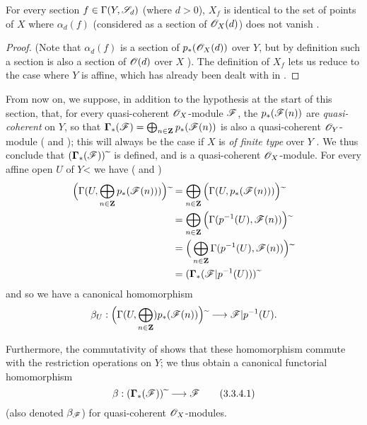 \begin{proposition}[3.3.3]
\label{II.3.3.3}
For every section $f\in\Gamma(Y,\mathscr{S}_d)$ (where $d>0$), $X_f$ is identical to the set of points of $X$ where $\alpha_d(f)$ (considered as a section of $\mathscr{O}_X(d)$) does not vanish .
\end{proposition}

\begin{proof}
(Note that $\alpha_d(f)$ is a section of $p_*(\mathscr{O}_X(d))$ over $Y$, but by definition such a section is also a section of $\mathscr{O}(d)$ over $X$ ).
The definition of $X_f$  lets us reduce to the case where $Y$ is affine, which has already been dealt with in .
\end{proof}

\begin{env}[3.3.4]
\label{II.3.3.4}
From now on, we suppose, in addition to the hypothesis at the start of this section, that, for every quasi-coherent $\mathscr{O}_X$-module $\mathscr{F}$, the $p_*(\mathscr{F}(n))$ are \emph{quasi-coherent} on $Y$, so that $\boldsymbol\Gamma_*(\mathscr{F})=\bigoplus_{n\in\mathbf{Z}}p_*(\mathscr{F}(n))$ is also a quasi-coherent $\mathscr{O}_Y$-module ( and );
this will always be the case if $X$ is \emph{of finite type} over $Y$ .
We thus conclude that $(\boldsymbol\Gamma_*(\mathscr{F})){\,\widetilde{\,}\,}$ is defined, and is a quasi-coherent $\mathscr{O}_X$-module.
For every affine open $U$ of $Y$< we have ( and )
\begin{align*}
  \Big( \Gamma(U,\bigoplus_{n\in\mathbf{Z}}p_*(\mathscr{F}(n))) \Big){\,\widetilde{\,}\,}
  &= \bigoplus_{n\in\mathbf{Z}}\Big( \Gamma(U,p_*(\mathscr{F}(n))) \Big){\,\widetilde{\,}\,}
\\&= \bigoplus_{n\in\mathbf{Z}}\Big( \Gamma(p^{-1}(U),\mathscr{F}(n)) \Big){\,\widetilde{\,}\,}
\\&= \Big( \bigoplus_{n\in\mathbf{Z}}\Gamma(p^{-1}(U),\mathscr{F}(n)) \Big){\,\widetilde{\,}\,}
\\&= (\boldsymbol\Gamma_*(\mathscr{F}|p^{-1}(U))){\,\widetilde{\,}\,}
\end{align*}
and so  we have a canonical homomorphism
\[
  \beta_U : \Big( \Gamma(U,\bigoplus_{n\in\bb{Z}})p_*(\sh{F}(n)) \Big)\supertilde \to \sh{F}|p^{-1}(U).
\]

Furthermore, the commutativity of  shows that these homomorphism commute with the restriction operations on $Y$;
we thus obtain a canonical functorial homomorphism
\[
\label{II.3.3.4.1}
  \beta : (\bbGamma_*(\sh{F}))\supertilde \to \sh{F}
\tag{3.3.4.1}
\]
(also denoted $\beta_{\mathscr{F}}$) for quasi-coherent $\mathscr{O}_X$-modules.
\end{env}

